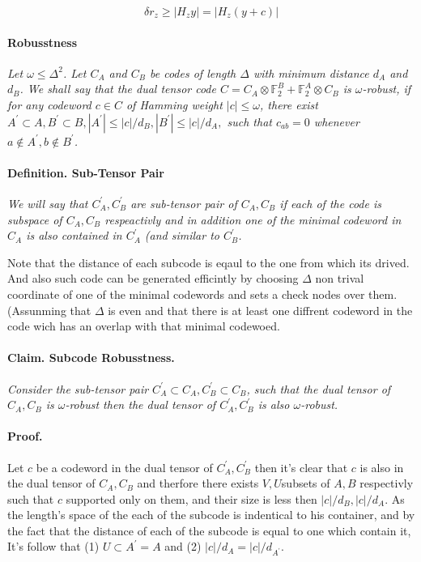 \documentclass{article}
\begin{document}
\begin{multicols*}{2}
\begin{equation*}
    \delta r_z \ge | H_{z} y | = | H_{z} \left( y + c \right) |  
\end{equation*}
\paragraph{Robusstness} \textit{ Let $ \omega \le \Delta^{2}$. Let $C_{A}$ and $C_{B}$ be codes of length $\Delta$ with minimum distance $d_{A}$ and $d_{B}$. We shall say that the dual tensor code $C = C_{A}\otimes \mathbb{F}^{B}_{2} + \mathbb{F}^{A}_{2} \otimes C_{B}$ is $\omega$-robust, if for any codeword $c\in C$ of Hamming weight $|c|\le \omega$, there exist $A^{\prime}\subset A, B^{\prime}\subset B, |A^{\prime}|\le |c|/d_{B}, |B^{\prime}|\le |c|/d_{A},$ such that $c_{ab}=0$ whenever $a \notin A^{\prime}, b \notin B^{\prime}$.} 
\paragraph{Definition. Sub-Tensor Pair} \textit{ We will say that $C_{A}^{\prime}, C_{B}^{\prime}$ are sub-tensor pair of $C_A,C_B$ if each of the code is subspace of $C_A, C_B$ respeactivly and in addition one of the  minimal codeword in $C_{A}$ is also contained in $C_{A}^{\prime}$ (and similar to $C_{B}^{\prime}$.}

  Note that the distance of each subcode is eqaul to the one from which its drived. And also such code can be generated efficintly by choosing $\Delta$ non trival coordinate of one of the minimal codewords and sets a check nodes over them. (Assunming that $\Delta$ is even and that there is at least one diffrent codeword in the code wich has an overlap with that minimal codewoed.    

 \paragraph{Claim. Subcode Robusstness.} \textit{ Consider the sub-tensor pair $C_{A}^{\prime}\subset C_{A}, C_{B}^{\prime}\subset C_{B}$, such that the dual tensor of $C_{A}, C_{B}$ is $\omega$-robust then the dual tensor of $C_{A}^{\prime}, C_{B}^{\prime}$ is also $\omega$-robust.} 
 \paragraph{Proof.} Let $c$ be a codeword in the dual tensor of $C_{A}^{\prime},C_{B}^{\prime}$ then it's clear that $c$ is also in the dual tensor of $C_{A}, C_{B}$ and therfore there exists $V,U$subsets of $A,B$ respectivly such that $c$ supported only on them, and their size is less then $|c|/d_{B}, |c|/d_{A}$. As the length's space of the each of the subcode is indentical to his container, and by the fact that the distance of each of the subcode is equal to one which contain it, It's follow that (1) $U \subset A^\prime = A $ and (2) $|c|/d_{A}=|c|/d_{A^\prime}$. 


\end{multicols*}
\end{document}
